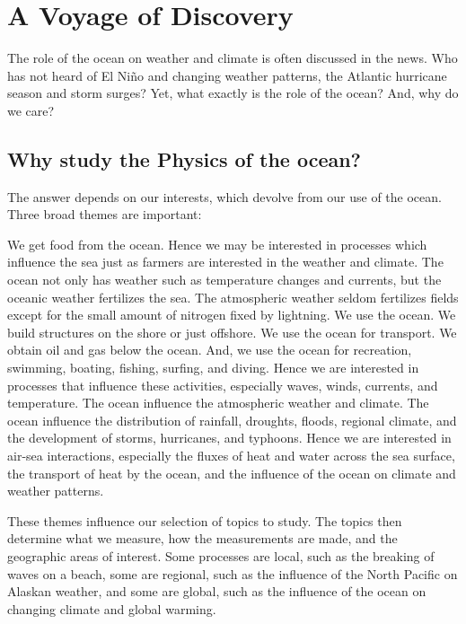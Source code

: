 \chapter{A Voyage of Discovery}

The role of the ocean on weather and climate is often discussed in the news. Who has not heard of El Ni\~{n}o and changing weather patterns, the Atlantic hurricane season and storm surges? Yet, what exactly is the role of the ocean? And, why do we care?

\section[Physics of the ocean]{Why study the Physics of the ocean?}

The answer depends on our interests, which devolve from our use of the ocean. Three
broad themes are important:
\begin{enumerate}
\vitem We get food from the ocean. Hence we may be interested
in processes which influence the sea just as farmers are interested in the weather and
climate. The ocean not only has weather such as temperature changes and currents,
but the oceanic  weather fertilizes the sea. The atmospheric weather seldom
fertilizes fields except for the small amount of nitrogen fixed by lightning.
\vspace{-0.5ex}
\vitem We use the ocean. We build structures on the shore or just offshore. We use
the ocean for transport. We obtain oil and gas below the ocean. And, we use the
ocean for recreation, swimming, boating, fishing, surfing, and diving. Hence we are
interested in processes that influence these activities, especially waves, winds,
currents, and temperature.
\vspace{-0.5ex}
\vitem The ocean influence the atmospheric weather and climate. The ocean
influence the distribution of rainfall, droughts, floods, regional climate, and the
development of storms, hurricanes, and typhoons. Hence we are interested in
air-sea interactions, especially the fluxes of heat and water across the sea surface,
the transport of heat by the ocean, and the influence of the ocean on climate and
weather patterns.
\end{enumerate}
These themes influence our selection of topics to study. The topics then
determine what we measure, how the measurements are made, and the geographic areas of
interest. Some processes are local, such as the breaking of waves on a beach, some
are regional, such as the influence of the North Pacific on Alaskan weather, and some
are global, such as the influence of the ocean on changing climate and global
warming.  

